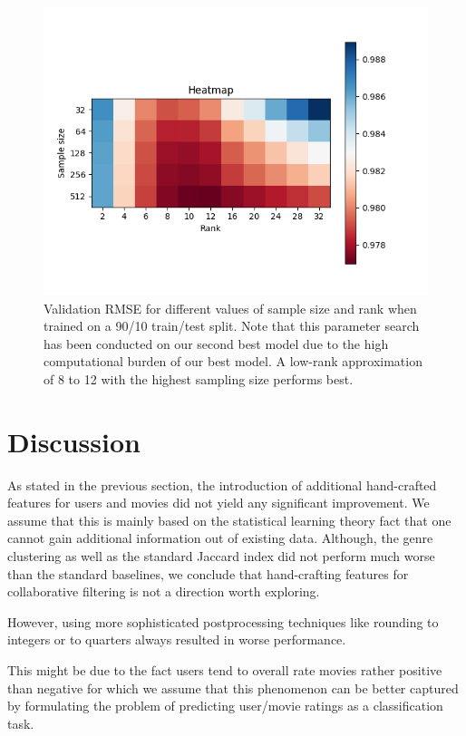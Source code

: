 \documentclass[10pt,conference,compsocconf]{IEEEtran}
\begin{document}
    \begin{figure}
        \includegraphics[width=\columnwidth]{figures/heatmap.png}
        \caption{Validation RMSE for different values of sample size and rank when trained on a 90/10 train/test split. Note that this parameter search has been conducted on our second best model due to the high computational burden of our best model.
        A low-rank approximation of 8 to 12 with the highest sampling size performs best.}
        \label{fig:Heatmap}
    \end{figure}


    \section{Discussion}
    As stated in the previous section, the introduction of additional hand-crafted features for users and movies did not yield any significant improvement.
    We assume that this is mainly based on the statistical learning theory fact that one cannot gain additional information out of existing data.
    Although, the genre clustering as well as the standard Jaccard index did not perform much worse than the standard baselines, we conclude that hand-crafting features for collaborative filtering is not a direction worth exploring.

    However, using more sophisticated postprocessing techniques like rounding to integers or to quarters always resulted in worse performance.

    This might be due to the fact users tend to overall rate movies rather positive than negative for which we assume that this phenomenon can be better captured by formulating the problem of predicting user/movie ratings as a classification task.
\end{document}
